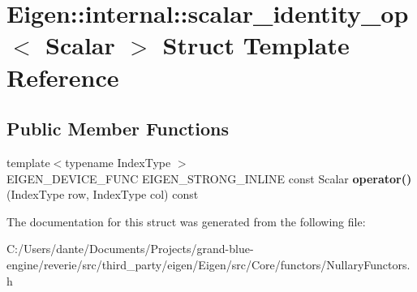 \hypertarget{struct_eigen_1_1internal_1_1scalar__identity__op}{}\section{Eigen\+::internal\+::scalar\+\_\+identity\+\_\+op$<$ Scalar $>$ Struct Template Reference}
\label{struct_eigen_1_1internal_1_1scalar__identity__op}
\subsection*{Public Member Functions}
\begin{DoxyCompactItemize}
\item 
\mbox{\label{struct_eigen_1_1internal_1_1scalar__identity__op_a8bb3bb0bc9356e0fd655e3ab4e622480}} 
{\footnotesize template$<$typename Index\+Type $>$ }\\E\+I\+G\+E\+N\+\_\+\+D\+E\+V\+I\+C\+E\+\_\+\+F\+U\+NC E\+I\+G\+E\+N\+\_\+\+S\+T\+R\+O\+N\+G\+\_\+\+I\+N\+L\+I\+NE const Scalar {\bfseries operator()} (Index\+Type row, Index\+Type col) const
\end{DoxyCompactItemize}


The documentation for this struct was generated from the following file\+:\begin{DoxyCompactItemize}
\item 
C\+:/\+Users/dante/\+Documents/\+Projects/grand-\/blue-\/engine/reverie/src/third\+\_\+party/eigen/\+Eigen/src/\+Core/functors/Nullary\+Functors.\+h\end{DoxyCompactItemize}
